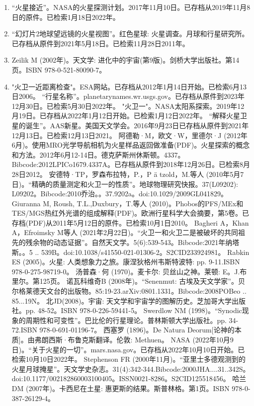 \begin{enumerate}
\item “火星接近”。NASA的火星探测计划。2017年11月10日。已存档从2019年11月8日的原件。已检索1月18日2022年。
\item “幻灯片2地球望远镜的火星视图”。红色星球: 火星调查。月球和行星研究所。已存档从原件到2021年5月18日。已检索11月28日2011年。
\item Zeilik M (2002年)。天文学: 进化中的宇宙(第9版)。剑桥大学出版社。第14页。ISBN 978-0-521-80090-7。
\item "火卫一近距离检查"。ESA网站。已存档从2012年1月14日开始。已检索6月13日2006。
 “行星名称”。planetarynames.wr.usgs.gov。已存档从原件到2023年12月30日。已检索5月30日2022年。
 "火卫一"。NASA太阳系探索。2019年12月19日。已存档从2022年1月12日开始。已检索1月12日2022年。
 “解释火星卫星的诞生”。AAS新星。美国天文学会。2016年9月23日已存档从原件到2021年12月13日。已检索12月13日2021。
 阿德勒·M，欧文·W，里德尔·J (2012年6月)。使用MRO光学导航相机为火星样品返回做准备(PDF)。火星探索的概念和方法。2012年6月12-14日。德克萨斯州休斯顿。4337。Bibcode:2012LPICo1679.4337A。已存档从原件到2018年12月26日。已检索8月28日2012。
 安德特·TP，罗森布拉特，P.，P ä tzold，M.等人 (2010年5月7日)。“精确的质量测定和火卫一的性质”。地球物理研究快报。37(L09202): L09202。Bibcode:2010乔治。。37.9202a。doi:10.1029/2009GL041829。
 Giuranna M, Roush, T.L.,Duxbury，T.等人 (2010)。Phobos的PFS/MEx和TES/MGS热红外光谱的组成解释(PDF)。欧洲行星科学大会摘要，第5卷。已存档(PDF)从2011年5月12日的原件。已检索10月1日2010。
 Bagheri A，Khan A，Efroimsky M等人 (2021年2月22日)。“火卫一和火卫二是被破坏的共同祖先的残余物的动态证据”。自然天文学。5(6):539-543。Bibcode:2021年纳塔斯。。5 .. 539B。doi:10.1038/s41550-021-01306-2。S2CID233924981。 
 Rabkin ES (2005)。火星: 人类想象力之旅。康涅狄格州韦斯特波特: pp. 9-11.ISBN 978-0-275-98719-0。
 汤普森·何 (1970)。麦卡尔: 贝丝山之神。莱顿: E。J.布里尔。第125页。
 诺瓦科维奇B (2008年)。“Senenmut: 古埃及天文学家”。贝尔格莱德天文台的出版物。85:19-23.arXiv:0801.1331。Bibcode:2008POBeo .. 85...19N。
 北JD(2008)。宇宙: 天文学和宇宙学的图解历史。芝加哥大学出版社。pp. 48-52。ISBN 978-0-226-59441-5。
 Swerdlow NM (1998)。“Synodic现象的周期性和可变性”。巴比伦的行星理论。普林斯顿大学出版社。pp. 34-72.ISBN 978-0-691-01196-7。
 西塞罗 (1896)。De Natura Deorum[论神的本质]。由弗朗西斯·布鲁克斯翻译。伦敦: Methuen。
 NASA (2022年10月9日)。“关于火星的一切”。mars.nasa.gov。已存档从2022年10月10日开始。已检索10月10日2022年。
 Stephenson FR (2000年11月)。“亚里士多德观测到的火星月球掩星”。天文学史杂志。31(4):342-344.Bibcode:2000JHA....31..342S。doi:10.1177/002182860003100405。ISSN0021-8286。S2CID125518456。  
 哈兰DM (2007年)。卡西尼在土星: 惠更斯的结果。斯普林格。第1页。ISBN 978-0-387-26129-4。

\end{enumerate}
